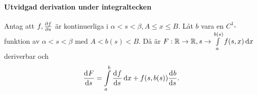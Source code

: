 \proof

\paragraph{Utvidgad derivation under integraltecken}
Antag att $f, \pdv{f}{s}$ är kontinuerliga i $\alpha < s < \beta, A\leq x\leq B$. Låt $b$ vara en $C^1$-funktion av $\alpha < s < \beta$ med $A < b(s) < B$. Då är $F:\mathbb{R}\to\mathbb{R}, s\to\int\limits_{a}^{b(s)}f(s, x)\dd{x}$ deriverbar och
\begin{align*}
	\dv[]{F}{s} (s) = \int\limits_{a}^{b}\dv[]{f}{s} (s, x)\dd{x} + f(s, b(s))\dv[]{b}{s} (s).
\end{align*}